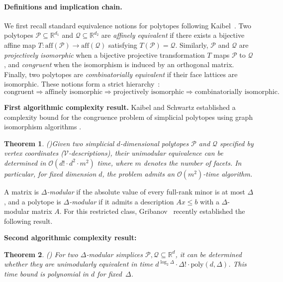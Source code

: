 \documentclass[reqno, 12pt]{article}
\newtheorem{thm}{Theorem}[section]
\theoremstyle{mydefinition}
\theoremstyle{myremark}
\numberwithin{algorithm}{section}
\begin{document}
\paragraph{Definitions and implication chain.}
We first recall standard equivalence notions for polytopes following Kaibel~\cite{Kaibel}.
Two polytopes $\mathcal{P}\subseteq\mathbb{R}^{d_1}$ and $\mathcal{Q}\subseteq\mathbb{R}^{d_2}$ are \emph{affinely equivalent} if there exists a bijective affine map $T\colon\mathrm{aff}(\mathcal{P})\to\mathrm{aff}(\mathcal{Q})$ satisfying $T(\mathcal{P})=\mathcal{Q}$.
Similarly, $\mathcal{P}$ and $\mathcal{Q}$ are \emph{projectively isomorphic} when a bijective projective transformation $T$ maps $\mathcal{P}$ to $\mathcal{Q}$, and \emph{congruent} when the isomorphism is induced by an orthogonal matrix.
Finally, two polytopes are \emph{combinatorially equivalent} if their face lattices are isomorphic.
These notions form a strict hierarchy~\cite{Kaibel}:
\[
\text{congruent}\Rightarrow\text{affinely isomorphic}\Rightarrow\text{projectively isomorphic}\Rightarrow\text{combinatorially isomorphic}.
\]


\textbf{First algorithmic complexity result.}
Kaibel and Schwartz established a complexity bound for the congruence problem of simplicial polytopes using graph isomorphism algorithms \cite{Luks-Graph}.
\begin{thm}{\em (\cite[Proposition 4]{Kaibel})}\label{K-S-Algorithm}
Given two simplicial $d$-dimensional polytopes $\mathcal{P}$ and $\mathcal{Q}$ specified by vertex coordinates ($\mathcal{V}$-descriptions),
their unimodular equivalence can be determined in $\mathcal O(d!\cdot d^2\cdot m^2)$ time,
where $m$ denotes the number of facets. In particular, for fixed dimension $d$,
the problem admits an $\mathcal O(m^2)$-time algorithm.
\end{thm}

A matrix is \emph{$\Delta$-modular} if the absolute value of every full-rank minor is at most $\Delta$,
and a polytope is \emph{$\Delta$-modular} if it admits a description $Ax\leq b$ with a $\Delta$-modular matrix $A$.
For this restricted class, Gribanov~\cite{Gribanov} recently established the following result.

\textbf{Second algorithmic complexity result:}
\begin{thm}{\em (\cite[Theorem 2]{Gribanov})}
For two $\Delta$-modular simplices $\mathcal{P}, \mathcal{Q} \subseteq \mathbb{R}^d$,
it can be determined whether they are unimodularly equivalent in time
$d^{\log_{2}\Delta} \cdot \Delta! \cdot \mathrm{poly}(d,\Delta)$.
This time bound is polynomial in $d$ for fixed~$\Delta$.
\end{thm}
\end{document}
